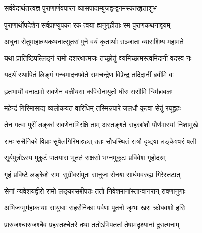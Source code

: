 
\vakta{}
\shrota{}
\tags{}

\storymeta





\twolineshloka
{सर्ववेदार्थतत्त्वज्ञ पुराणार्णवपारग}
{व्यासपादाम्बुजद्वन्द्वनमस्कारहृताशुभ}%

\twolineshloka
{पुराणार्थोपदेशेन सर्वप्राण्युपका रक}
{त्वया ह्यनुगृहीताः स्म पुराणकथनाद्वयम्}%

\twolineshloka
{अधुना सेतुमाहात्म्यकथनात्सुतरां मुने}
{वयं कृतार्थाः सञ्जाता व्यासशिष्य महामते}%

\twolineshloka
{यथा प्रातिष्ठिपल्लिङ्गं रामो दशरथात्मजः}
{तच्छ्रोतुं वयमिच्छामस्त्वमिदानीं वदस्व नः}%


\twolineshloka
{यदर्थं स्थापितं लिङ्गं गन्धमादनपर्वते}
{रामचन्द्रेण विप्रेन्द्र तदिदानीं ब्रवीमि वः}%

\twolineshloka
{हृतभार्यो वनाद्रामो रावणेन बलीयसा}
{कपिसेनायुतो धीरः ससौमि त्रिर्महाबलः}%

\twolineshloka
{महेन्द्रं गिरिमासाद्य व्यलोकयत वारिधिम्}
{तस्मिन्नपारे जलधौ कृत्वा सेतुं रघूद्वहः}%

\twolineshloka
{तेन गत्वा पुरीं लङ्कां रावणेनाभिरक्षि ताम्}
{अस्तङ्गते सहस्रांशौ पौर्णमास्यां निशामुखे}%

\twolineshloka
{रामः ससैनिको विप्राः सुवेलगिरिमारुहत्}
{ततः सौधस्थितं रात्रौ दृष्ट्वा लङ्केश्वरं बली}%

\twolineshloka
{सूर्यपुत्रोऽस्य मुकुटं पातयास भूतले}
{राक्षसो भग्नमुकुटः प्रविवेश गृहोदरम्}%

\twolineshloka
{गृहं प्रविष्टे लङ्केशे रामः सुग्रीवसंयुतः}
{सानुजः सेनया सार्धमवरुह्य गिरेस्तटात्}%

\twolineshloka
{सेनां न्यवेशयद्वीरो रामो लङ्कासमीपतः}
{ततो निवेशमानांस्तान्वानरान् रावणानुगाः}%

\twolineshloka
{अभिजग्मुर्महाकायाः सायुधाः सहसैनिकाः}
{पर्वणः पूतनो जृम्भः खरः क्रोधवशो हरिः}%

\twolineshloka
{प्रारुजश्चारुजश्चैव प्रहस्तश्चेतरे तथा}
{ततोऽभिपततां तेषामदृश्यानां दुरात्मनाम्}%

